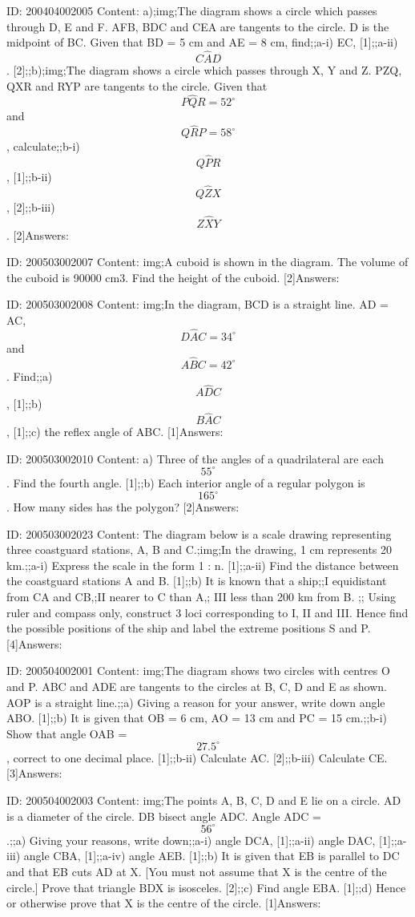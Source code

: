 \documentclass{article}
\begin{document}
ID: 200404002005
Content:
a);img;The diagram shows a circle which passes through D, E and F. AFB, BDC and CEA	are tangents to the circle. D is the midpoint of BC. Given that BD = 5 cm and AE = 8 cm, find;;a-i) EC, [1];;a-ii) $$C \hat AD$$. [2];;b);img;The diagram shows a circle which passes through X, Y and Z. PZQ, QXR and RYP are	tangents to the circle. Given that $$P \hat QR=52^{\circ}$$ and $$Q \hat RP=58^{\circ}$$, calculate;;b-i) $$Q \hat PR$$, [1];;b-ii) $$Q \hat ZX$$, [2];;b-iii) $$Z \hat XY$$. [2]Answers:

ID: 200503002007
Content:
img;A cuboid is shown in the diagram. The volume of the cuboid is 90000 cm3. Find the height of the cuboid. [2]Answers:

ID: 200503002008
Content:
img;In the diagram, BCD is a straight line. AD = AC, $$D \hat AC=34^{\circ}$$ and $$A \hat BC=42^{\circ}$$. Find;;a) $$A \hat DC$$, [1];;b) $$B \hat AC$$, [1];;c) the reflex angle of ABC. [1]Answers:

ID: 200503002010
Content:
a) Three of the angles of a quadrilateral are each $$55^{\circ}$$. Find the fourth angle. [1];;b) Each interior angle of a regular polygon is $$165^{\circ}$$. How many sides has the polygon? [2]Answers:

ID: 200503002023
Content:
The diagram below is a scale drawing representing three coastguard stations, A, B and C.;img;In the drawing, 1 cm represents 20 km.;;a-i) Express the scale in the form 1 : n. [1];;a-ii) Find the distance between the coastguard stations A and B. [1];;b) It is known that a ship;;I	equidistant from CA and CB,;II	nearer to C than A,; III	less than 200 km from B. ;; Using ruler and compass only, construct 3 loci corresponding to I, II and III. Hence find the possible positions of the ship and label the extreme positions S and P. [4]Answers:

ID: 200504002001
Content:
img;The diagram shows two circles with centres O and P. ABC and ADE are tangents to the circles at B, C, D and E as shown. AOP is a straight line.;;a) Giving a reason for your answer, write down angle ABO. [1];;b) It is given that OB = 6 cm, AO = 13 cm and PC = 15 cm.;;b-i) Show that angle OAB = $$27.5^{\circ}$$, correct to one decimal place. [1];;b-ii) Calculate AC. [2];;b-iii) Calculate CE. [3]Answers:

ID: 200504002003
Content:
img;The points A, B, C, D and E lie on a circle. AD is a diameter of the circle. DB bisect angle ADC. Angle ADC = $$56^{\circ}$$.;;a) Giving your reasons, write down;;a-i) angle DCA, [1];;a-ii) angle DAC, [1];;a-iii) angle CBA, [1];;a-iv) angle AEB. [1];;b) It is given that EB is parallel to DC and that EB cuts AD at X. [You must not assume that X is the centre of the circle.] Prove that triangle BDX is isosceles. [2];;c) Find angle EBA. [1];;d) Hence or otherwise prove that X is the centre of the circle. [1]Answers:
\end{document}

